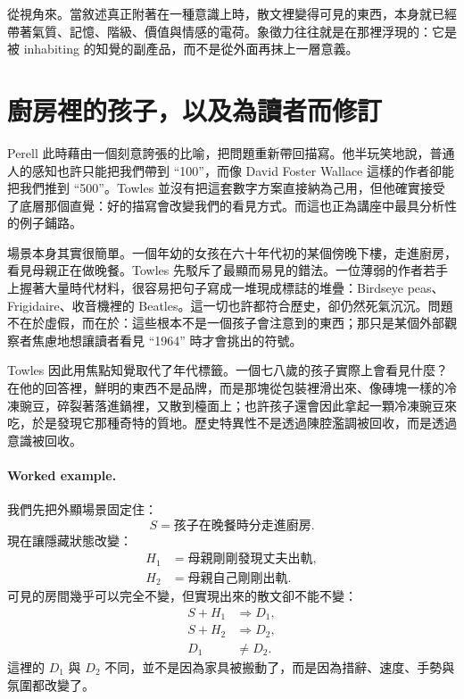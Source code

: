 從視角來。當敘述真正附著在一種意識上時，散文裡變得可見的東西，本身就已經帶著氣質、記憶、階級、價值與情感的電荷。象徵力往往就是在那裡浮現的：它是被 inhabiting 的知覺的副產品，而不是從外面再抹上一層意義。

\section{廚房裡的孩子，以及為讀者而修訂}

Perell 此時藉由一個刻意誇張的比喻，把問題重新帶回描寫。他半玩笑地說，普通人的感知也許只能把我們帶到 ``100''，而像 David Foster Wallace 這樣的作者卻能把我們推到 ``500''。Towles 並沒有把這套數字方案直接納為己用，但他確實接受了底層那個直覺：好的描寫會改變我們的看見方式。而這也正為講座中最具分析性的例子鋪路。

場景本身其實很簡單。一個年幼的女孩在六十年代初的某個傍晚下樓，走進廚房，看見母親正在做晚餐。Towles 先駁斥了最顯而易見的錯法。一位薄弱的作者若手上握著大量時代材料，很容易把句子寫成一堆現成標誌的堆疊：Birdseye peas、Frigidaire、收音機裡的 Beatles。這一切也許都符合歷史，卻仍然死氣沉沉。問題不在於虛假，而在於：這些根本不是一個孩子會注意到的東西；那只是某個外部觀察者焦慮地想讓讀者看見 ``1964'' 時才會挑出的符號。

Towles 因此用焦點知覺取代了年代標籤。一個七八歲的孩子實際上會看見什麼？在他的回答裡，鮮明的東西不是品牌，而是那塊從包裝裡滑出來、像磚塊一樣的冷凍豌豆，碎裂著落進鍋裡，又散到檯面上；也許孩子還會因此拿起一顆冷凍豌豆來吃，於是發現它那種奇特的質地。歷史特異性不是透過陳腔濫調被回收，而是透過意識被回收。

\paragraph{Worked example.}

我們先把外顯場景固定住：
\begin{equation}
S = \text{孩子在晚餐時分走進廚房}.
\end{equation}
現在讓隱藏狀態改變：
\begin{align}
H_1 &= \text{母親剛剛發現丈夫出軌}, \\
H_2 &= \text{母親自己剛剛出軌}.
\end{align}
可見的房間幾乎可以完全不變，但實現出來的散文卻不能不變：
\begin{align}
S + H_1 &\Rightarrow D_1, \\
S + H_2 &\Rightarrow D_2, \\
D_1 &\neq D_2.
\end{align}
這裡的 \(D_1\) 與 \(D_2\) 不同，並不是因為家具被搬動了，而是因為措辭、速度、手勢與氛圍都改變了。

